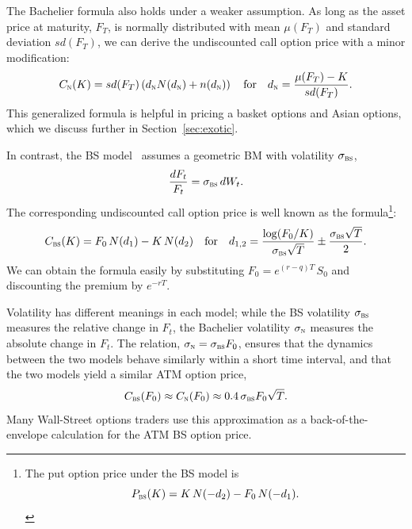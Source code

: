 \documentclass[a4paper,review]{elsarticle}
\newcommand{\qtext}[2][\quad]{#1\text{#2}#1}
\newcommand{\sigman}{\sigma_\textsc{n}}
\newcommand{\sigmabs}{\sigma_\textsc{bs}}
\newcommand{\norm}{\textsc{n}}
\newcommand{\bs}{\textsc{bs}}
\begin{document}
The Bachelier formula also holds under a weaker assumption. As long as the asset price at maturity, $F_T$, is normally distributed with mean $\mu(F_T)$ and standard deviation $sd(F_T)$, we can derive the undiscounted call option price with a minor modification:
\begin{equation} \label{eq:bach_gen}
C_\norm(K) = sd(F_T) \left( d_\norm N(d_\norm) + n(d_\norm) \right)
\qtext{for} d_\norm = \frac{\mu(F_T) - K}{sd(F_T)}.
\end{equation}
This generalized formula is helpful in pricing a basket options and Asian options, which we discuss further in Section~\ref{sec:exotic}.

In contrast, the BS model~\citep{blackscholes1973,black1976} assumes a geometric BM with volatility $\sigmabs$,
$$ \frac{dF_t}{F_t} = \sigmabs\, dW_t.
$$
The corresponding undiscounted call option price is well known as the \citet{black1976} formula\footnote{The put option price under the BS model is 
	$$P_\bs(K) = K\, N(-d_2) - F_0\,N(-d_1).$$}:
\begin{equation} \label{eq:bsm}
	C_\bs(K) = F_0\,N(d_1) - K\, N(d_2)
	\qtext{for}
	d_{1,2} = \frac{\log (F_0/K)}{\sigmabs\sqrt{T}} \pm \frac{\sigmabs\sqrt{T}}{2}.
\end{equation}
We can obtain the \citet{blackscholes1973} formula easily by substituting $F_0 = e^{(r-q)T}\,S_0$ and discounting the premium by $e^{-rT}$.

Volatility has different meanings in each model; while the BS volatility $\sigmabs$ measures the relative change in $F_t$, the Bachelier volatility $\sigman$ measures the absolute change in $F_t$. The relation, $\sigman = \sigmabs F_0$, ensures that the dynamics between the two models behave similarly within a short time interval, and that the two models yield a similar ATM option price, 
$$ C_\bs(F_0) \approx C_\norm(F_0) \approx 0.4\, \sigmabs F_0 \sqrt{T}.$$ 
Many Wall-Street options traders use this approximation as a back-of-the-envelope calculation for the ATM BS option price.
\end{document}
